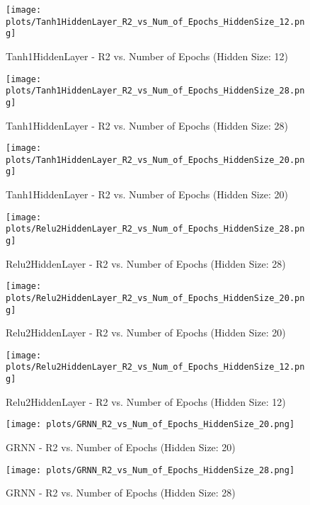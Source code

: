 
\begin{figure}[H]
    \centering
    \texttt{[image: plots/Tanh1HiddenLayer\_R2\_vs\_Num\_of\_Epochs\_HiddenSize\_12.png]}
    \caption{Tanh1HiddenLayer - R2 vs. Number of Epochs (Hidden Size: 12)}
\end{figure}

\begin{figure}[H]
    \centering
    \texttt{[image: plots/Tanh1HiddenLayer\_R2\_vs\_Num\_of\_Epochs\_HiddenSize\_28.png]}
    \caption{Tanh1HiddenLayer - R2 vs. Number of Epochs (Hidden Size: 28)}
\end{figure}

\begin{figure}[H]
    \centering
    \texttt{[image: plots/Tanh1HiddenLayer\_R2\_vs\_Num\_of\_Epochs\_HiddenSize\_20.png]}
    \caption{Tanh1HiddenLayer - R2 vs. Number of Epochs (Hidden Size: 20)}
\end{figure}

\begin{figure}[H]
    \centering
    \texttt{[image: plots/Relu2HiddenLayer\_R2\_vs\_Num\_of\_Epochs\_HiddenSize\_28.png]}
    \caption{Relu2HiddenLayer - R2 vs. Number of Epochs (Hidden Size: 28)}
\end{figure}

\begin{figure}[H]
    \centering
    \texttt{[image: plots/Relu2HiddenLayer\_R2\_vs\_Num\_of\_Epochs\_HiddenSize\_20.png]}
    \caption{Relu2HiddenLayer - R2 vs. Number of Epochs (Hidden Size: 20)}
\end{figure}

\begin{figure}[H]
    \centering
    \texttt{[image: plots/Relu2HiddenLayer\_R2\_vs\_Num\_of\_Epochs\_HiddenSize\_12.png]}
    \caption{Relu2HiddenLayer - R2 vs. Number of Epochs (Hidden Size: 12)}
\end{figure}

\begin{figure}[H]
    \centering
    \texttt{[image: plots/GRNN\_R2\_vs\_Num\_of\_Epochs\_HiddenSize\_20.png]}
    \caption{GRNN - R2 vs. Number of Epochs (Hidden Size: 20)}
\end{figure}

\begin{figure}[H]
    \centering
    \texttt{[image: plots/GRNN\_R2\_vs\_Num\_of\_Epochs\_HiddenSize\_28.png]}
    \caption{GRNN - R2 vs. Number of Epochs (Hidden Size: 28)}
\end{figure}

